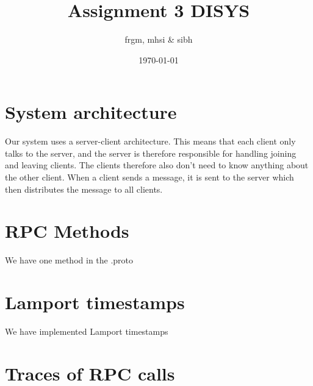 \documentclass{article}
\title{Assignment 3 DISYS}
\author{frgm, mhsi & sibh}
\date{\today}
\begin{document}
\maketitle

\section*{System architecture}
Our system uses a server-client architecture.
This means that each client only talks to the server,
and the server is therefore responsible for handling joining and leaving clients.
The clients therefore also don't need to know anything about the other client.
When a client sends a message, it is sent to the server which then distributes the message to all clients.

\section*{RPC Methods}
We have one method in the .proto 

\section*{Lamport timestamps}
We have implemented Lamport timestamps 

\section*{Traces of RPC calls}
\end{document}
